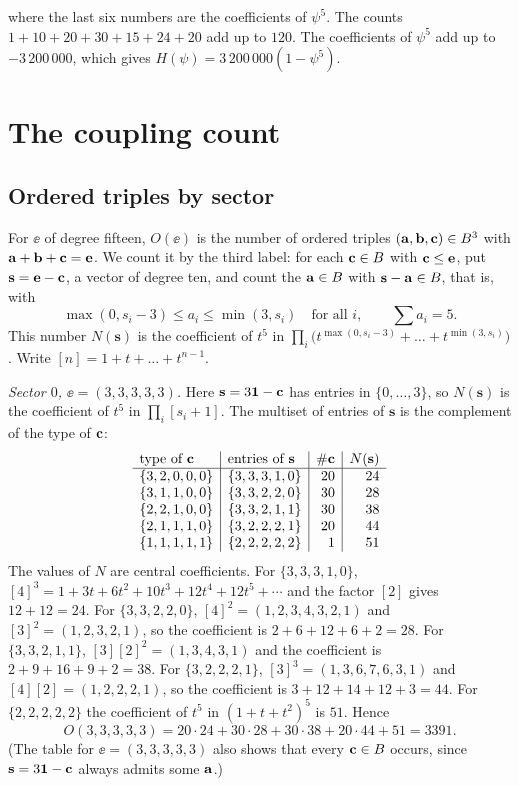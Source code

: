 where the last six numbers are the coefficients of $\psi^5$. The counts
$1+10+20+30+15+24+20$ add up to $120$. The coefficients of $\psi^5$ add up
to $-3\,200\,000$, which gives $H(\psi)=3\,200\,000(1-\psi^5)$.

\section{The coupling count}\label{app:count}

\subsection{Ordered triples by sector}

For $\ee$ of degree fifteen, $O(\ee)$ is the number of ordered triples
$(\mathbf{a},\mathbf{b},\mathbf{c})\in B^3$ with $\mathbf{a}+\mathbf{b}+\mathbf{c}=\mathbf{e}$. We count it by the third
label: for each $\mathbf{c}\in B$ with $\mathbf{c}\le\mathbf{e}$, put $\mathbf s=\mathbf{e}-\mathbf{c}$, a
vector of degree ten, and count the $\mathbf{a}\in B$ with $\mathbf s-\mathbf{a}\in B$,
that is, with
\[
\max(0,s_i-3)\le a_i\le\min(3,s_i)\quad\text{for all }i,\qquad
\textstyle\sum a_i=5.
\]
This number $N(\mathbf s)$ is the coefficient of $t^5$ in
$\prod_i\big(t^{\max(0,s_i-3)}+\dots+t^{\min(3,s_i)}\big)$. Write
$[n]=1+t+\dots+t^{n-1}$.

\emph{Sector $0$, $\ee=(3,3,3,3,3)$.} Here $\mathbf s=3\mathbf{1}-\mathbf{c}$ has
entries in $\{0,\dots,3\}$, so $N(\mathbf s)$ is the coefficient of $t^5$ in
$\prod_i[s_i+1]$. The multiset of entries of $\mathbf s$ is the complement
of the type of $\mathbf{c}$:
\[
\begin{array}{l|l|r|r}
\text{type of }\mathbf{c}&\text{entries of }\mathbf s&\#\mathbf{c}&N(\mathbf s)\\\hline
\{3,2,0,0,0\}&\{3,3,3,1,0\}&20&24\\
\{3,1,1,0,0\}&\{3,3,2,2,0\}&30&28\\
\{2,2,1,0,0\}&\{3,3,2,1,1\}&30&38\\
\{2,1,1,1,0\}&\{3,2,2,2,1\}&20&44\\
\{1,1,1,1,1\}&\{2,2,2,2,2\}&1&51
\end{array}
\]
The values of $N$ are central coefficients. For $\{3,3,3,1,0\}$,
$[4]^3=1+3t+6t^2+10t^3+12t^4+12t^5+\cdots$ and the factor $[2]$ gives
$12+12=24$. For $\{3,3,2,2,0\}$, $[4]^2=(1,2,3,4,3,2,1)$ and
$[3]^2=(1,2,3,2,1)$, so the coefficient is $2+6+12+6+2=28$. For
$\{3,3,2,1,1\}$, $[3][2]^2=(1,3,4,3,1)$ and the coefficient is
$2+9+16+9+2=38$. For $\{3,2,2,2,1\}$, $[3]^3=(1,3,6,7,6,3,1)$ and
$[4][2]=(1,2,2,2,1)$, so the coefficient is $3+12+14+12+3=44$. For
$\{2,2,2,2,2\}$ the coefficient of $t^5$ in $(1+t+t^2)^5$ is $51$. Hence
\[
O(3,3,3,3,3)=20\cdot24+30\cdot28+30\cdot38+20\cdot44+51=3391.
\]
(The table for $\ee=(3,3,3,3,3)$ also shows that every $\mathbf{c}\in B$ occurs,
since $\mathbf s=3\mathbf{1}-\mathbf{c}$ always admits some $\mathbf{a}$.)

